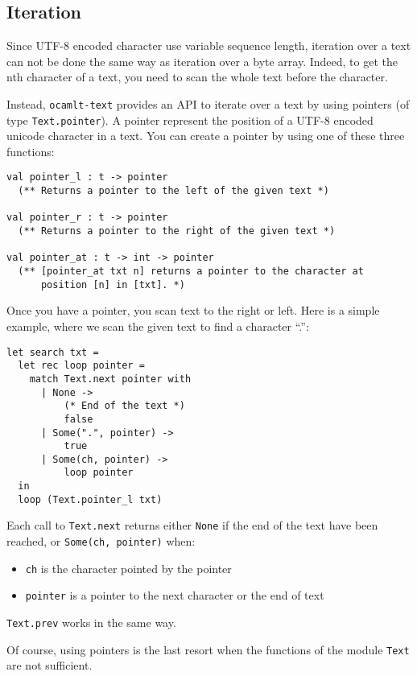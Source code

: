 \documentclass{article}
\newcommand{\oct}{\texttt{ocamlt-text}\xspace}
\begin{document}
\subsection{Iteration}

Since UTF-8 encoded character use variable sequence length, iteration
over a text can not be done the same way as iteration over a byte
array. Indeed, to get the nth character of a text, you need to scan
the whole text before the character.

Instead, \oct provides an API to iterate over a text by using pointers
(of type \texttt{Text.pointer}). A pointer represent the position of a
UTF-8 encoded unicode character in a text. You can create a pointer by
using one of these three functions:

\begin{verbatim}
val pointer_l : t -> pointer
  (** Returns a pointer to the left of the given text *)

val pointer_r : t -> pointer
  (** Returns a pointer to the right of the given text *)

val pointer_at : t -> int -> pointer
  (** [pointer_at txt n] returns a pointer to the character at
      position [n] in [txt]. *)
\end{verbatim}

Once you have a pointer, you scan text to the right or left. Here is a
simple example, where we scan the given text to find a character ``.'':

\begin{verbatim}
let search txt =
  let rec loop pointer =
    match Text.next pointer with
      | None ->
          (* End of the text *)
          false
      | Some(".", pointer) ->
          true
      | Some(ch, pointer) ->
          loop pointer
  in
  loop (Text.pointer_l txt)
\end{verbatim}

Each call to \texttt{Text.next} returns either \texttt{None} if the
end of the text have been reached, or \texttt{Some(ch, pointer)} when:

\begin{itemize}
\item \texttt{ch} is the character pointed by the pointer
\item \texttt{pointer} is a pointer to the next character or the end of text
\end{itemize}

\texttt{Text.prev} works in the same way.

Of course, using pointers is the last resort when the functions of the
module \texttt{Text} are not sufficient.
\end{document}
